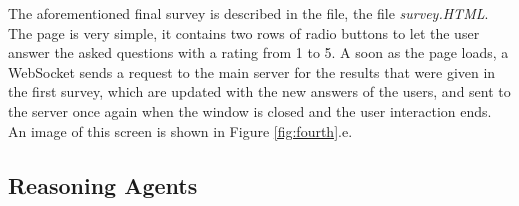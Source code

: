 \documentclass{article}
\begin{document}
The aforementioned final survey is described in the file, the file \textit{survey.HTML}. The page is very simple, it contains two rows of radio buttons to let the user answer the asked questions with a rating from 1 to 5. A soon as the page loads, a WebSocket sends a request to the main server for the results that were given in the first survey, which are updated with the new answers of the users, and sent to the server once again when the window is closed and the user interaction ends. An image of this screen is shown in Figure \ref{fig:fourth}.e.




\subsection{Reasoning Agents}
\end{document}

